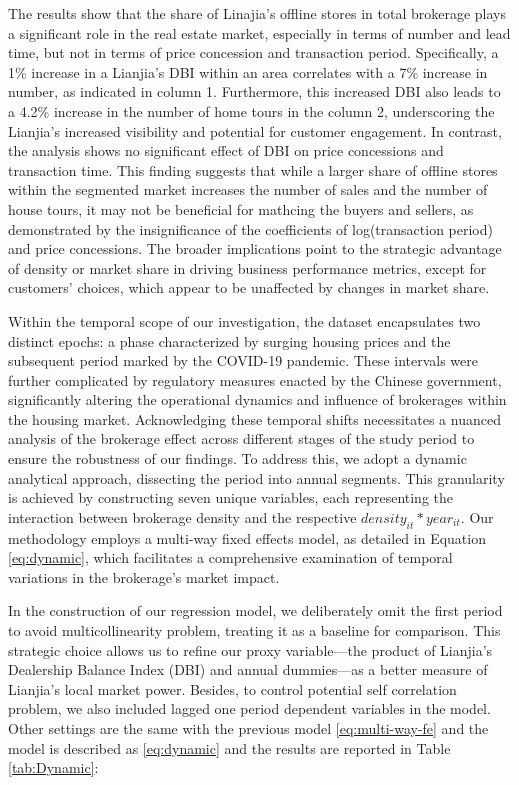 \documentclass[11pt]{article}
\begin{document}
The results show that the share of Linajia's offline stores in total brokerage plays a significant role in the real estate market, especially in terms of number and lead time, but not in terms of price concession and transaction period. Specifically, a 1\% increase in a Lianjia's DBI within an area correlates with a 7\% increase in number, as indicated in column 1. Furthermore, this increased DBI also leads to a 4.2\% increase in the number of home tours in the column 2, underscoring the Lianjia's increased visibility and potential for customer engagement. In contrast, the analysis shows no significant effect of DBI on price concessions and transaction time. This finding suggests that while a larger share of offline stores within the segmented market increases the number of sales and the number of house tours, it may not be beneficial for mathcing the buyers and sellers, as demonstrated by the insignificance of the coefficients of log(transaction period) and price concessions. The broader implications point to the strategic advantage of density or market share in driving business performance metrics, except for customers' choices, which appear to be unaffected by changes in market share.

Within the temporal scope of our investigation, the dataset encapsulates two distinct epochs: a phase characterized by surging housing prices and the subsequent period marked by the COVID-19 pandemic. These intervals were further complicated by regulatory measures enacted by the Chinese government, significantly altering the operational dynamics and influence of brokerages within the housing market. Acknowledging these temporal shifts necessitates a nuanced analysis of the brokerage effect across different stages of the study period to ensure the robustness of our findings. To address this, we adopt a dynamic analytical approach, dissecting the period into annual segments. This granularity is achieved by constructing seven unique variables, each representing the interaction between brokerage density and the respective $density_{it} * year_{it}$. Our methodology employs a multi-way fixed effects model, as detailed in Equation \eqref{eq:dynamic}, which facilitates a comprehensive examination of temporal variations in the brokerage's market impact.

In the construction of our regression model, we deliberately omit the first period to avoid multicollinearity problem, treating it as a baseline for comparison. This strategic choice allows us to refine our proxy variable—the product of Lianjia's Dealership Balance Index (DBI) and annual dummies—as a better measure of Lianjia's local market power. Besides, to control potential self correlation problem, we also included lagged one period dependent variables in the model. Other settings are the same with the previous model \eqref{eq:multi-way-fe} and the model is described as \eqref{eq:dynamic} and the results are reported in Table \ref{tab:Dynamic}: 
\end{document}
